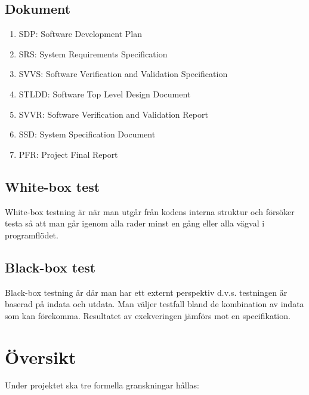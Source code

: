 \documentclass[a4paper]{article}
\begin{document}
\subsection{Dokument}

\begin{enumerate}

\item SDP: Software Development Plan

\item SRS: System Requirements Specification

\item SVVS: Software Verification and Validation Specification

\item STLDD: Software Top Level Design Document

\item SVVR: Software Verification and Validation Report

\item SSD: System Specification Document

\item PFR: Project Final Report


\end{enumerate}

\subsection{White-box test}

White-box testning är när man utgår från kodens interna struktur och försöker testa så att man går igenom alla rader minst en gång eller alla vägval i programflödet.

\subsection{Black-box test}

Black-box testning är där man har ett externt perspektiv d.v.s. testningen är baserad på indata och utdata. Man väljer testfall bland de kombination av indata som kan förekomma. Resultatet av exekveringen jämförs mot en specifikation.


\section{Översikt}

Under projektet ska tre formella granskningar hållas:
\end{document}
